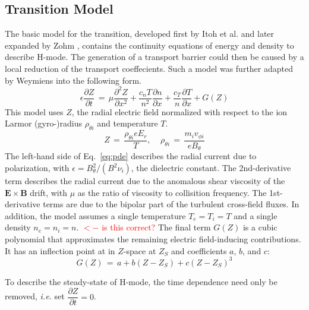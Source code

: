\documentclass[a4paper]{article}
\newcommand\mynotes[1]{\textcolor{red}{#1}}
\begin{document}
\subsection{Transition Model}
The basic model for the transition, developed first by Itoh et al. \cite{itoh_edge_1991} and later expanded by Zohm \cite{zohm_dynamic_1994}, contains the continuity equations of energy and density to describe H-mode.
The generation of a transport barrier could then be caused by a local reduction of the transport coeffecients.
Such a model was further adapted by Weymiens \cite{weymiens_bifurcation_2014} into the following form.
\begin{equation}
	\epsilon \frac{\partial Z}{\partial t} \,=\, \mu \frac{\partial^2 Z}{\partial x^2} + \frac{c_n T}{n^2} \frac{\partial n}{\partial x} + \frac{c_T}{n} \frac{\partial T}{\partial x} + G(Z)
	\label{eq:pde}
\end{equation}
This model uses $Z$, the radial electric field normalized with respect to the ion Larmor (gyro-)radius $\rho_{\theta i}$ and temperature $T$.
\begin{equation}
	Z \,=\, \frac{\rho_{\theta i} e E_r}{T}, ~~~~~ \rho_{\theta i} \,=\, \frac{m_i v_{\phi i}}{e B_\theta}
	\label{eq:normalization}
\end{equation}
The left-hand side of Eq.~\ref{eq:pde} describes the radial current due to polarization, with $\epsilon = B_\theta^2 / (B^2 \nu_i)$, the dielectric constant.
The 2nd-derivative term describes the radial current due to the anomalous shear viscosity of the $\mathbf{E}\times\mathbf{B}$ drift, with $\mu$ as the ratio of viscosity to collisition frequency.
The 1st-derivative terms are due to the bipolar part of the turbulent cross-field fluxes.
In addition, the model assumes a single temperature $T_e = T_i = T$ and a single density $n_e = n_i = n$. \mynotes{$<-$ is this correct?}
The final term $G(Z)$ is a cubic polynomial that approximates the remaining electric field-inducing contributions.
It has an inflection point at in $Z$-space at $Z_S$ and coefficients $a$, $b$, and $c$:
\begin{equation}
	G(Z) \,=\, a + b(Z - Z_S) + c(Z - Z_S)^3
\end{equation}

To describe the steady-state of H-mode, the time dependence need only be removed, \emph{i.e.} set $\dfrac{\partial Z}{\partial t} = 0$.
\end{document}
